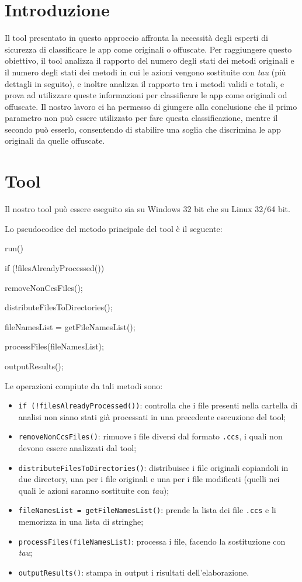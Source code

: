 \section{Introduzione}

Il tool presentato in questo approccio affronta la necessità degli esperti di sicurezza di classificare le app come originali o offuscate. Per raggiungere questo obiettivo, il tool analizza il rapporto del numero degli stati dei metodi originali e il numero degli stati dei metodi in cui le azioni vengono sostituite con \textit{tau} (più dettagli in seguito), e inoltre analizza il rapporto tra i metodi validi e totali, e prova ad utilizzare queste informazioni per classificare le app come originali od offuscate. Il nostro lavoro ci ha permesso di giungere alla conclusione che il primo parametro non può essere utilizzato per fare questa classificazione, mentre il secondo può esserlo, consentendo di stabilire una soglia che discrimina le app originali da quelle offuscate.

\section{Tool}

Il nostro tool può essere eseguito sia su Windows 32 bit che su Linux 32/64 bit.

Lo pseudocodice del metodo principale del tool è il seguente:

\begin{myalgorithm}[caption={Pseudocodice metodo run()}, label={cod:pseudocodice-metodo-run}]
run() {
  if (!filesAlreadyProcessed()) {
    removeNonCcsFiles();

    distributeFilesToDirectories();

    fileNamesList = getFileNamesList();

    processFiles(fileNamesList);

    outputResults();
  }
}
\end{myalgorithm}

Le operazioni compiute da tali metodi sono:

\begin{itemize}
\item
\verb|if (!filesAlreadyProcessed())|: controlla che i file presenti nella cartella di analisi non siano stati già processati in una precedente esecuzione del tool;
\item
\verb|removeNonCcsFiles()|: rimuove i file diversi dal formato \verb|.ccs|, i quali non devono essere analizzati dal tool;
\item
\verb|distributeFilesToDirectories()|: distribuisce i file originali copiandoli in due directory, una per i file originali e una per i file modificati (quelli nei quali le azioni saranno sostituite con \textit{tau});
\item
\verb|fileNamesList = getFileNamesList()|: prende la lista dei file \verb|.ccs| e li memorizza in una lista di stringhe;
\item
\verb|processFiles(fileNamesList)|: processa i file, facendo la sostituzione con \textit{tau};
\item
\verb|outputResults()|: stampa in output i risultati dell'elaborazione.
\end{itemize}

